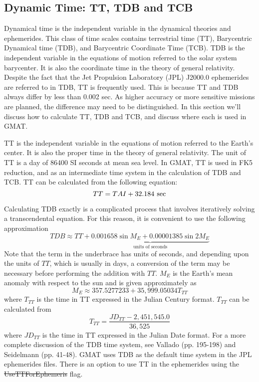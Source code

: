 \subsection{Dynamic Time: TT, TDB and TCB}
\label{Sec:DynamicTime}

Dynamical time is the independent variable in the dynamical
theories and ephemerides. This class of time scales contains
terrestrial time (TT),  Barycentric Dynamical time (TDB), and
Barycentric Coordinate Time (TCB).    TDB is the independent
variable in the equations of motion referred to the solar system
barycenter. It is also the coordinate time in the theory of
general relativity. Despite the fact that the Jet Propulsion
Laboratory (JPL) J2000.0 ephemerides are referred to in TDB, TT is
frequently used. This is because TT and TDB always differ by less
than 0.002 sec. As higher accuracy or more sensitive missions are
planned, the difference may need to be distinguished.  In this
section we'll discuss how to calculate TT, TDB and TCB, and
discuss where each is used in GMAT.

TT is the independent variable in the equations of motion referred
to the Earth's center. It is also the proper time in the theory of
general relativity. The unit of TT is a day of 86400 SI seconds at
mean sea level.  In GMAT, TT is used in FK5 reduction, and as an
intermediate time system in the calculation of TDB and TCB.  TT
can be calculated from the following equation:
%
\begin{equation}
     TT = TAI + 32.184 \hspace{.05 in}\mbox{sec}
\end{equation}
%

Calculating TDB exactly is a complicated process that involves
iteratively solving a transcendental equation.  For this reason,
it is convenient to use the following approximation
%
\begin{equation}
     TDB \approx TT + \underbrace{0.001658\sin{M_E} +
     0.00001385\sin{2M_E}}_{\mbox{units of seconds}}
\end{equation}
%
Note that the term in the underbrace has units of seconds, and
depending upon the units of $TT$, which is usually in days, a
conversion of the term may be necessary before performing the
addition with $TT$. $M_E$ is the Earth's mean anomaly with respect
to the sun and is given approximately as
%
\begin{equation}
     M_E \approx 357.5277233 + 35,999.05034 T_{TT}
\end{equation}
%
where $T_{TT}$ is the time in TT expressed in the Julian Century
format.  $T_{TT}$ can be calculated from
%
\begin{equation}
     T_{TT} = \frac{JD_{TT} - 2,451,545.0}{36,525}
\end{equation}
%
where $JD_{TT}$  is the time in TT expressed in the Julian Date
format.  For a more complete discussion of the TDB time system, see
Vallado\cite{vallado2} (pp. 195-198) and Seidelmann\cite{seidelmann}
(pp. 41-48).  GMAT uses TDB as the default time system in the JPL
ephemerides files. There is an option to use TT in the ephemerides
using the \st{UseTTForEphemeris} flag.

